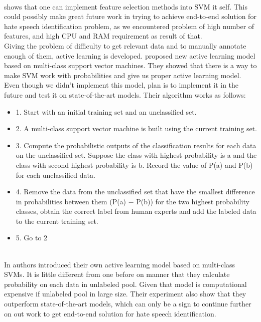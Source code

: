 \documentclass[10pt, a4paper]{article}
\begin{document}
\\\cite{ChenSVMFeatures} shows that one can implement feature selection methods into SVM it self. This could possibly make great future work in trying to achieve end-to-end solution for hate speech identification problem, as we encountered problem of high number of features, and high CPU and RAM requirement as result of that.
\\Giving the problem of difficulty to get relevant data and to manually annotate enough of them, active learning is developed. \cite{LuoALPlankton} proposed new active learning model based on multi-class support vector machines. They showed that there is a way to make SVM work with probabilities and give us proper active learning model. Even though we didn't implement this model, plan is to implement it in the future and test it on state-of-the-art models. Their algorithm works as follows:
\begin{itemize}
	\item 1. Start with an initial training set and an unclassified set.
	\item 2. A multi-class support vector machine is built using the current training set.
	\item 3. Compute the probabilistic outputs of the classification results for each data on the unclassified set. Suppose the class with highest probability is a and the class with second highest probability is b. Record the value of P(a) and P(b) for each unclassified data.
	\item 4. Remove the data from the unclassified set that have the smallest difference in probabilities between them (P(a) − P(b)) for the two highest probability classes, obtain the correct label from human experts and add the labeled data to the current training set.
	\item 5. Go to 2
\end{itemize}

\\In \cite{YangMultiClassAL} authors introduced their own active learning model based on multi-class SVMs. It is little different from one before on manner that they calculate probability on each data in unlabeled pool. Given that model is computational expensive if unlabeled pool in large size. Their experiment also show that they outperform state-of-the-art models, which can only be a sign to continue further on out work to get end-to-end solution for hate speech identification.

 
\end{document}
